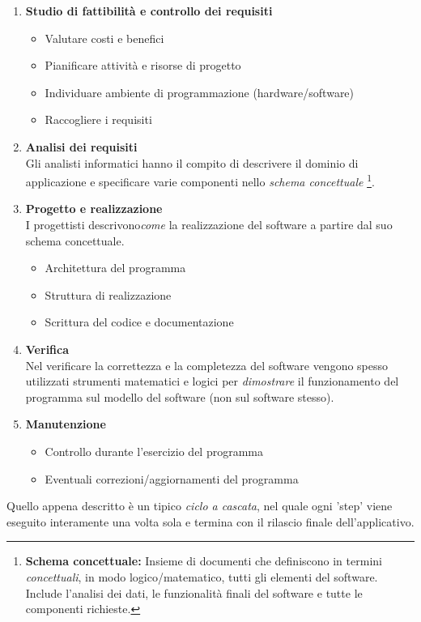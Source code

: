 \begin{enumerate}
	\item \textbf{Studio di fattibilità e controllo dei requisiti}
		\begin{itemize}
			\item Valutare costi e benefici
			\item Pianificare attività e risorse di progetto
			\item Individuare ambiente di programmazione (hardware/software)
			\item Raccogliere i requisiti
		\end{itemize}
	\item \textbf{Analisi dei requisiti} \hfill \\
		Gli analisti informatici hanno il compito di descrivere il dominio di applicazione e specificare varie componenti nello \textit{schema concettuale}
		\footnote{\textbf{Schema concettuale:} Insieme di documenti che definiscono in termini \textit{concettuali}, in modo logico/matematico, tutti gli elementi del software. 
		Include l'analisi dei dati, le funzionalità finali del software e tutte le componenti richieste.}.
	\item \textbf{Progetto e realizzazione} \hfill \\
		I progettisti descrivono\textit{come} la realizzazione del software a partire dal suo schema concettuale.
		\begin{itemize}
			\item Architettura del programma
			\item Struttura di realizzazione
			\item Scrittura del codice e documentazione
		\end{itemize}
	\item \textbf{Verifica} \hfill \\
		Nel verificare la correttezza e la completezza del software vengono spesso utilizzati strumenti matematici e logici	per \textit{dimostrare} il funzionamento del programma sul modello del software (non sul software stesso).
	\item \textbf{Manutenzione}
		\begin{itemize}
			\item Controllo durante l'esercizio del programma
			\item Eventuali correzioni/aggiornamenti del programma
		\end{itemize}
\end{enumerate}
Quello appena descritto è un tipico \textit{ciclo a cascata}, nel quale ogni 'step' viene eseguito interamente una volta sola e termina con il rilascio finale dell'applicativo.\\
